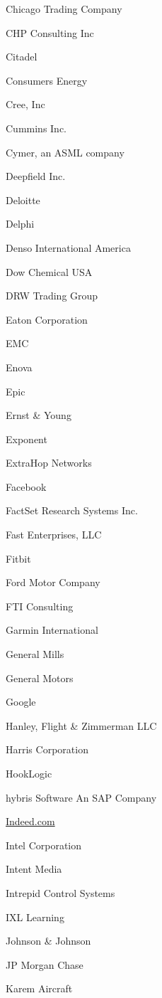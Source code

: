 \documentclass[twoside]{article}
\begin{document}
\begin{center}
\begin{multicols}{5}
\begin{FlushLeft}
\begin{compactitem}
\item Chicago Trading Company
\item CHP Consulting Inc
\item Citadel
\item Consumers Energy
\item Cree, Inc
\item Cummins Inc.
\item Cymer, an ASML company
\item Deepfield Inc.
\item Deloitte
\item Delphi
\item Denso International America
\item Dow Chemical USA
\item DRW Trading Group
\item Eaton Corporation
\item EMC
\item Enova
\item Epic
\item Ernst \& Young
\item Exponent
\item ExtraHop Networks
\item Facebook
\item FactSet Research Systems Inc.
\item Fast Enterprises, LLC
\item Fitbit
\item Ford Motor Company
\item FTI Consulting
\item Garmin International
\item General Mills
\item General Motors
\item Google
\item Hanley, Flight \& Zimmerman LLC
\item Harris Corporation
\item HookLogic
\item hybris Software An SAP Company
\item \url{Indeed.com}
\item Intel Corporation
\item Intent Media
\item Intrepid Control Systems
\item IXL Learning
\item Johnson \& Johnson
\item JP Morgan Chase
\item Karem Aircraft

\end{compactitem}
\end{FlushLeft}
\end{multicols}
\end{center}
\end{document}
